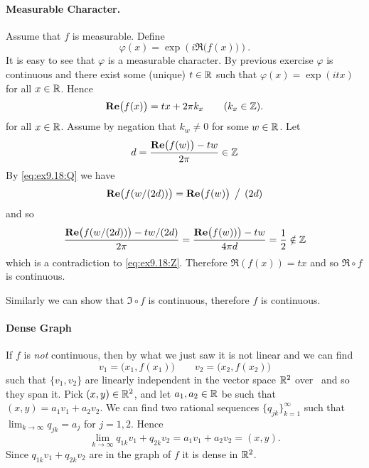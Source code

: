 \begin{enumerate}
\paragraph{Measurable Character.}
Assume that $f$ is measurable.
Define
\begin{equation*}
\varphi(x) = \exp\left(i\Re\bigl(f(x)\bigr)\right).
\end{equation*}
It is easy to see that \(\varphi\) is a measurable character. 
By previous exercise
\(\varphi\) is continuous and there exist 
some (unique) \(t\in\R\) such that \(\varphi(x) = \exp(itx)\)
for all \(x\in \R\). Hence
\begin{equation*}
\Re\bigl(f(x)\bigr) = tx + 2\pi k_x \qquad (k_x \in \Z).
\end{equation*}
for all \(x\in\R\).
Assume by negation that \(k_w\neq 0\) for some \(w\in\R\).
Let 
\begin{equation} \label{eq:ex9.18:Z}
d = \frac{\Re\bigl(f(w)\bigr) - tw}{2\pi} \in \Z
\end{equation}
By \eqref{eq:ex9.18:Q} we have
\begin{equation*}
\Re\bigl(f(w/(2d))\bigr) = \Re\bigl(f(w)\bigr) \,\bigm/\, (2d)
\end{equation*}
and so
\begin{equation*}
\frac{\Re\bigl(f(w/(2d))\bigr) - tw/(2d)}{2\pi}
= \frac{\Re\bigl(f(w))\bigr) - tw}{4\pi d}
= \half \notin \Z
\end{equation*}
which is a contradiction to \eqref{eq:ex9.18:Z}.
Therefore \(\Re(f(x)) = tx\) and so \(\Re\circ f\) is continuous.

Similarly we can show that \(\Im\circ f\) is continuous, 
therefore $f$ is continuous.


\paragraph{Dense Graph}
If $f$ is \emph{not} continuous, then by what we just saw it is not linear
and we can find
\begin{equation*}
v_1 = \bigl(x_1,f(x_1)\bigr)
\qquad
v_2 = \bigl(x_2,f(x_2)\bigr)
\end{equation*}
such that \(\{v_1,v_2\}\) are linearly independent 
in the vector space \(\R^2\) over \R\ and so they span it.
Pick \((x,y)\in\R^2\), and let \(a_1,a_2\in\R\) be such that
\((x,y)=a_1v_1+a_2v_2\).
We can find two rational sequences \(\{q_{jk}\}_{k=1}^\infty\)
such that \(\lim_{k\to\infty} q_{jk} = a_j\) for \(j=1,2\).
Hence
\begin{equation*}
\lim_{k\to\infty} q_{1k}v_1 + q_{2k}v_2 = a_1v_1+a_2v_2 = (x,y).
\end{equation*}
Since \(q_{1k}v_1 + q_{2k}v_2\) are in the graph of $f$
it is dense in \(\R^2\).


\end{enumerate}
